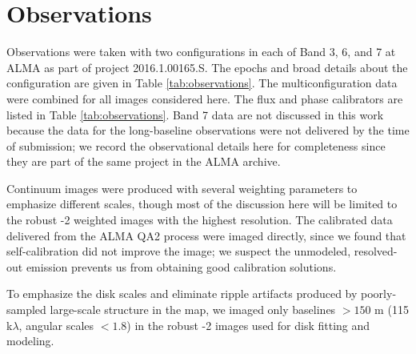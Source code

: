 \documentclass[twocolumn]{aastex61}
\newcommand{\sourcei}{SrcI\xspace}
\begin{document}
\section{Observations}
\label{sec:observations}

Observations were taken with two configurations in each of Band 3, 6, and 7 at
ALMA as part of project 2016.1.00165.S.  The epochs and broad details about the
configuration are given in Table \ref{tab:observations}.  The
multiconfiguration data were combined for all
images considered here.
The flux and phase calibrators are listed in Table \ref{tab:observations}.
Band 7 data are not discussed in this work because the data for
the long-baseline observations were not delivered by the time of submission; we
record the observational details here for completeness since they are part of
the same project in the ALMA archive.

Continuum images were produced with several weighting parameters to emphasize
different scales, though most of the discussion here will be limited to the
robust -2 weighted images with the highest resolution.  The calibrated data
delivered from the ALMA QA2 process were imaged directly, since we found
that self-calibration did not improve the image; we suspect the unmodeled, resolved-out
emission prevents us from obtaining good calibration solutions.

To emphasize the disk scales and eliminate ripple artifacts produced by
poorly-sampled large-scale structure in the map, we imaged only baselines
$>150$ m (115 k$\lambda$, angular scales $<1.8$\arcsec) in the robust -2 images
used for disk fitting and modeling.

\end{document}

